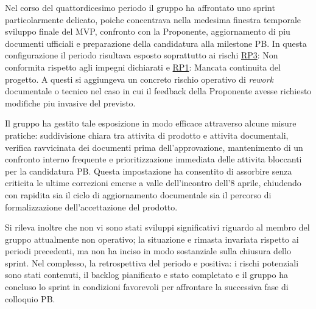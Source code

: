 \documentclass[a4paper, 11pt, oneside]{scrartcl} %
\begin{document}
Nel corso del quattordicesimo periodo il gruppo ha affrontato uno sprint particolarmente delicato, poiche concentrava nella medesima finestra temporale sviluppo finale del MVP, confronto con la Proponente, aggiornamento di piu documenti ufficiali e preparazione della candidatura alla milestone PB. In questa configurazione il periodo risultava esposto soprattutto ai rischi \hyperref[sec:rp3]{RP3}: Non conformita rispetto agli impegni dichiarati e \hyperref[sec:rp1]{RP1}: Mancata continuita del progetto. A questi si aggiungeva un concreto rischio operativo di \textit{rework} documentale o tecnico nel caso in cui il feedback della Proponente avesse richiesto modifiche piu invasive del previsto.

Il gruppo ha gestito tale esposizione in modo efficace attraverso alcune misure pratiche: suddivisione chiara tra attivita di prodotto e attivita documentali, verifica ravvicinata dei documenti prima dell'approvazione, mantenimento di un confronto interno frequente e prioritizzazione immediata delle attivita bloccanti per la candidatura PB. Questa impostazione ha consentito di assorbire senza criticita le ultime correzioni emerse a valle dell'incontro dell'8 aprile, chiudendo con rapidita sia il ciclo di aggiornamento documentale sia il percorso di formalizzazione dell'accettazione del prodotto.

Si rileva inoltre che non vi sono stati sviluppi significativi riguardo al membro del gruppo attualmente non operativo; la situazione e rimasta invariata rispetto ai periodi precedenti, ma non ha inciso in modo sostanziale sulla chiusura dello sprint. Nel complesso, la retrospettiva del periodo e positiva: i rischi potenziali sono stati contenuti, il backlog pianificato e stato completato e il gruppo ha concluso lo sprint in condizioni favorevoli per affrontare la successiva fase di colloquio PB.
\end{document}
